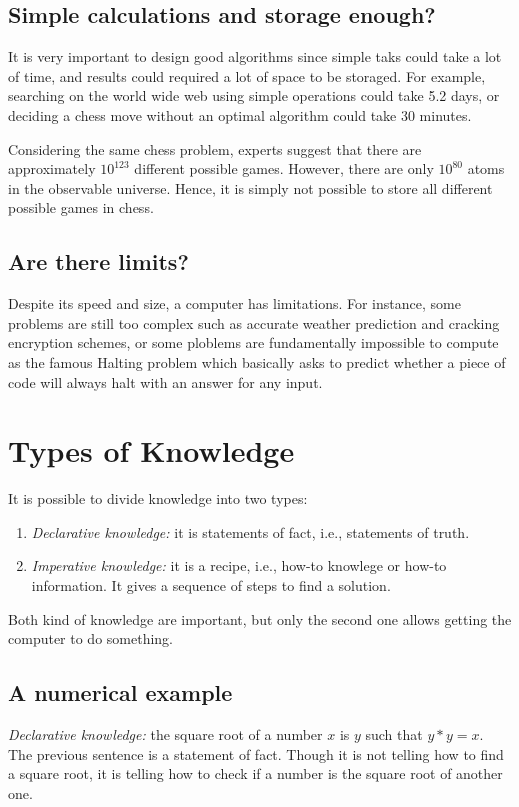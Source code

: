 \documentclass[a4paper]{article}
\begin{document}
\subsection{Simple calculations and storage enough?}

It is very important to design good algorithms since simple taks could take
a lot of time, and results could required a lot of space to be storaged.
For example, searching on the world wide web using simple operations could take
5.2 days, or deciding a chess move without an optimal algorithm could take 30
minutes.

Considering the same chess problem, experts suggest that there are
approximately $10^{123}$ different possible games. However, there are only
$10^{80}$ atoms in the observable universe. Hence, it is simply not
possible to store all different possible games in chess.

\subsection{Are there limits?}

Despite its speed and size, a computer has limitations. For instance, some
problems are still too complex such as accurate weather prediction and
cracking encryption schemes, or some ploblems are fundamentally impossible to
compute as the famous Halting problem which basically asks to predict whether
a piece of code will always halt with an answer for any input.

\section{Types of Knowledge}

It is possible to divide knowledge into two types:

\begin{enumerate}
  \item \textit{Declarative knowledge:} it is statements of fact, i.e., statements of
        truth.
  \item \textit{Imperative knowledge:} it is a recipe, i.e., how-to knowlege or how-to
        information. It gives a sequence of steps to find a solution.
\end{enumerate}

Both kind of knowledge are important, but only the second one allows getting
the computer to do something.

\subsection{A numerical example}
\textit{Declarative knowledge:} the square root of a number $x$ is $y$ such
that $y * y = x$. The previous sentence is a statement of fact. Though it is
not telling how to find a square root, it is telling how to check if a number
is the square root of another one.
\end{document}
